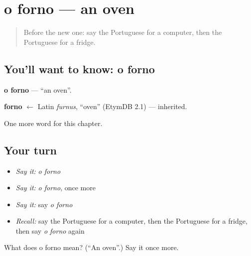 \section[o forno]{o forno — an oven}

\label{lesson:PT-C93-forno}



\begin{quote}
Before the new one: say the Portuguese for a computer, then the Portuguese for a fridge.
\end{quote}

\subsection*{You'll want to know: o forno}
\textbf{o forno} — \textquotedblleft{}an oven\textquotedblright{}.

\begin{cousinweb}
\textbf{forno} $\leftarrow$ Latin \emph{furnus}, \textquotedblleft{}oven\textquotedblright{} (EtymDB 2.1) — inherited.
\end{cousinweb}

\begin{grammarlens}[title={What you've built}]
One more word for this chapter.
\end{grammarlens}

\subsection*{Your turn}
\begin{itemize}
\raggedright
  \item \emph{Say it:} \emph{o forno}
  \item \emph{Say it:} \emph{o forno}, once more
  \item \emph{Say it:} say \emph{o forno}
  \item \emph{Recall:} say the Portuguese for a computer, then the Portuguese for a fridge, then say \emph{o forno} again
\end{itemize}

\begin{tcolorbox}[breakable,colback=teal!4,colframe=teal!35!black,title={Before you move on}]
What does o forno mean? (\textquotedblleft{}An oven\textquotedblright{}.) Say it once more.
\end{tcolorbox}
